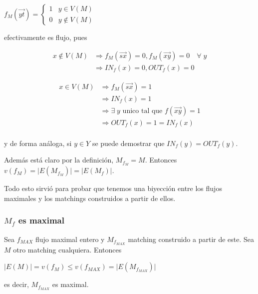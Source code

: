 \documentclass[10pt,a4paper]{article}
\begin{document}
\begin{center}
$f_M (\overrightarrow{yt})= \begin{cases} 1 & y \in V(M)\\ 0 & y \not \in V(M) \end{cases}$
\end{center}

efectivamente es flujo, pues

\begin{center}
\begin{align*} x\not \in V(M) &\Rightarrow f_M(\overrightarrow{sx}) = 0, f_M(\overrightarrow{xy}) = 0\quad \forall \; y\\ & \Rightarrow IN_f(x) = 0, OUT_f(x) = 0 \end{align*}
\end{center}

\begin{center}
\begin{align*} x \in V(M) &\Rightarrow f_M(\overrightarrow{sx})=1\\ &\Rightarrow IN_f(x) = 1\\ &\Rightarrow \exists \; y \text{ unico tal que } f(\overrightarrow{xy}) = 1\\ &\Rightarrow OUT_f(x) = 1 = IN_f(x)\\ \end{align*}
\end{center}

y de forma análoga, si $y \in Y$ se puede demostrar que $IN_f(y) = OUT_f(y)$.

Además está claro por la definición, $M_{f_M} = M$. Entonces $v(f_M) = \lvert E(M_{f_M})\rvert = \lvert E(M_f)\rvert$.

Todo esto sirvió para probar que tenemos una biyección entre los flujos maximales y los matchings construidos a partir de ellos.

\subsubsection*{$M_f$ es maximal}

Sea $f_{MAX}$ flujo maximal entero y $M_{f_{MAX}}$ matching construido a partir de este. Sea $M$ otro matching cualquiera. Entonces

\begin{center}
$\lvert E(M)\rvert = v(f_M) \leq v(f_{MAX}) = \lvert E(M_{f_{MAX}})\rvert$
\end{center}

es decir, $M_{f_{MAX}}$ es maximal.
\end{document}
